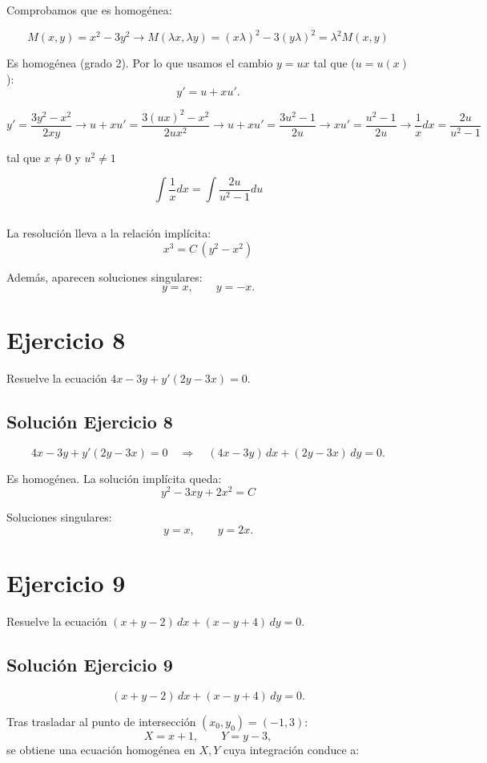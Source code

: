 \documentclass[12pt]{article}
\begin{document}
Comprobamos que es homogénea:

\[
M(x,y) = x^2-3y^2 \rightarrow M(\lambda x, \lambda y) = (x\lambda)^2 - 3(y\lambda)^2 = \lambda^2M(x,y)
\]

Es homogénea (grado 2). Por lo que usamos el cambio \(y=ux\) tal que (\(u=u(x)\)):
\[
y'=u+xu'.
\]

\[
y' = \frac{3y^2-x^2}{2xy} \rightarrow u + xu' = \frac{3(ux)^2 - x^2}{2ux^2}\rightarrow u + xu' = \frac{3u^2-1}{2u} \rightarrow xu' = \frac{u^2-1}{2u} \rightarrow \frac{1}{x}dx = \frac{2u}{u^2-1}
\]

tal que $x \neq 0$ y $u^2 \neq 1$

\[
\int\frac{1}{x}dx = \int\frac{2u}{u^2-1}du
\]

\[

\]

La resolución lleva a la relación implícita:
\[
\boxed{\,x^3=C\,(y^2-x^2)\,}
\]

Además, aparecen soluciones singulares:
\[
y=x,\qquad y=-x.
\]

\section*{Ejercicio 8}
Resuelve la ecuación $4x - 3y + y'(2y - 3x) = 0$.

\subsection*{Solución Ejercicio 8}

\[
4x-3y+y'(2y-3x)=0
\quad\Rightarrow\quad
(4x-3y)\,dx+(2y-3x)\,dy=0.
\]

Es homogénea. La solución implícita queda:
\[
\boxed{\,y^2-3xy+2x^2=C\,}
\]

Soluciones singulares:
\[
y=x,\qquad y=2x.
\]

\section*{Ejercicio 9}
Resuelve la ecuación $(x + y - 2)\,dx + (x - y + 4)\,dy = 0$.

\subsection*{Solución Ejercicio 9}

\[
(x+y-2)\,dx+(x-y+4)\,dy=0.
\]

Tras trasladar al punto de intersección \((x_0,y_0)=(-1,3)\):
\[
X=x+1,\qquad Y=y-3,
\]
se obtiene una ecuación homogénea en \(X,Y\) cuya integración conduce a:
\end{document}

